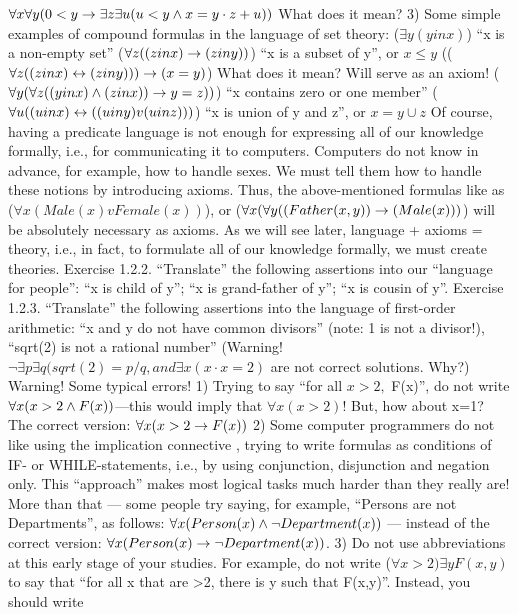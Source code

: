 \(\forall x\forall y(0<y \rightarrow  \exists z\exists u(u<y \wedge  x=y\cdot z+u))\) What does it mean?
3) Some simple examples of compound formulas in the language of set theory:
(\(\exists y(y in x)\)) ``x is a non-empty set''
(\(\forall z((z in x)\rightarrow (z in y))\)) ``x is a subset of y'', or \(x\leq y\)
((\(\forall z((z in x)\leftrightarrow ( z in y)))\rightarrow ( x=y)\)) What does it mean? Will serve as an axiom!
(\(\forall y(\forall z((y in x) \wedge  (z in x))\rightarrow y=z))\)) ``x contains zero or one member''
(\(\forall u((u in x)\leftrightarrow ( (u in y) v (u in z)))\)) ``x is union of y and z'', or \(x=y\cup z\)
Of course, having a predicate language is not enough for expressing all of our knowledge formally, i.e.,
for communicating it to computers. Computers do not know in advance, for example, how to handle
sexes. We must tell them how to handle these notions by introducing axioms. Thus, the above-mentioned
formulas like as (\(\forall x(Male(x) v Female(x))\)), or (\(\forall x(\forall y((Father(x, y))\rightarrow (Male(x)))\)) will be absolutely
necessary as axioms. As we will see later, language + axioms = theory, i.e., in fact, to formulate all of our
knowledge formally, we must create theories.
Exercise 1.2.2. ``Translate'' the following assertions into our ``language for people'':
``x is child of y'';
``x is grand-father of y'';
``x is cousin of y''.
Exercise 1.2.3. ``Translate'' the following assertions into the language of first-order arithmetic:
``x and y do not have common divisors'' (note: 1 is not a divisor!),
``sqrt(2) is not a rational number''
(Warning! \(\neg \exists p\exists q(sqrt(2)=p/q, and \exists x(x\cdot x=2)\) are not correct solutions. Why?)
Warning! Some typical errors!
1) Trying to say ``for all \(x>2,\) F(x)'', do not write \(\forall x(x>2\wedge F(x))\)---this would imply that \(\forall x(x>2)\)! But,
how about x=1? The correct version: \(\forall x(x>2\rightarrow F(x))\)
2) Some computer programmers do not like using the implication connective \IMPLIES , trying to write formulas
as conditions of IF- or WHILE-statements, i.e., by using conjunction, disjunction and negation only. This
``approach'' makes most logical tasks much harder than they really are! More than that --- some people try
saying, for example, ``Persons are not Departments'', as follows:
\(\forall x(Person(x)\wedge \neg Department(x))\) --- instead of the correct version: \(\forall x(Person(x)\rightarrow \neg Department(x))\).
3) Do not use abbreviations at this early stage of your studies. For example, do not write (\(\forall x>2)\exists yF(x,y)\)
to say that ``for all x that are >2, there is y such that F(x,y)''. Instead, you should write
